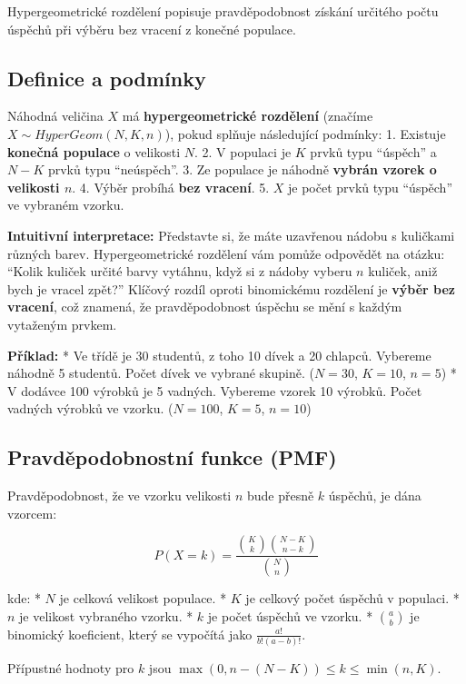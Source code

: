 \documentclass[
  czech,
  11pt,
  letterpaper,
  DIV=11,
  numbers=noendperiod]{scrreprt}
\begin{document}
Hypergeometrické rozdělení popisuje pravděpodobnost získání určitého
počtu úspěchů při výběru bez vracení z konečné populace.

\subsection{Definice a podmínky}\label{definice-a-podmuxednky-3}

Náhodná veličina \(X\) má {\textbf{hypergeometrické rozdělení}} (značíme
\(X \sim HyperGeom(N, K, n)\)), pokud splňuje následující podmínky: 1.
Existuje \textbf{konečná populace} o velikosti \(N\). 2. V populaci je
\(K\) prvků typu ``úspěch'' a \(N-K\) prvků typu ``neúspěch''. 3. Ze
populace je náhodně \textbf{vybrán vzorek o velikosti \(n\)}. 4. Výběr
probíhá \textbf{bez vracení}. 5. \(X\) je počet prvků typu ``úspěch'' ve
vybraném vzorku.

\textbf{Intuitivní interpretace:} Představte si, že máte uzavřenou
nádobu s kuličkami různých barev. Hypergeometrické rozdělení vám pomůže
odpovědět na otázku: ``Kolik kuliček určité barvy vytáhnu, když si z
nádoby vyberu \(n\) kuliček, aniž bych je vracel zpět?'' Klíčový rozdíl
oproti binomickému rozdělení je \textbf{výběr bez vracení}, což znamená,
že pravděpodobnost úspěchu se mění s každým vytaženým prvkem.

\textbf{Příklad:} * Ve třídě je 30 studentů, z toho 10 dívek a 20
chlapců. Vybereme náhodně 5 studentů. Počet dívek ve vybrané skupině.
(\(N=30\), \(K=10\), \(n=5\)) * V dodávce 100 výrobků je 5 vadných.
Vybereme vzorek 10 výrobků. Počet vadných výrobků ve vzorku. (\(N=100\),
\(K=5\), \(n=10\))

\subsection{Pravděpodobnostní funkce
(PMF)}\label{pravdux11bpodobnostnuxed-funkce-pmf-4}

Pravděpodobnost, že ve vzorku velikosti \(n\) bude přesně \(k\) úspěchů,
je dána vzorcem:

\[ P(X=k) = \frac{\binom{K}{k} \binom{N-K}{n-k}}{\binom{N}{n}} \]

kde: * \(N\) je celková velikost populace. * \(K\) je celkový počet
úspěchů v populaci. * \(n\) je velikost vybraného vzorku. * \(k\) je
počet úspěchů ve vzorku. * \(\binom{a}{b}\) je binomický koeficient,
který se vypočítá jako \(\frac{a!}{b!(a-b)!}\).

Přípustné hodnoty pro \(k\) jsou
\(\max(0, n-(N-K)) \le k \le \min(n, K)\).
\end{document}
